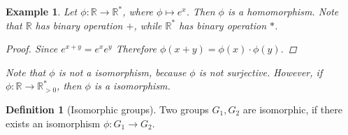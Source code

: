 \documentclass{article}
\theoremstyle{MyNonumberplain}
\theoremstyle{break}
\newtheorem*{proof}{Proof. }
\newcommand{\p}{\phi}
\theoremstyle{break}
\newtheorem{example}{Example}[section]
\theoremstyle{break}
\theoremstyle{definition}
\theoremstyle{break}
\newtheorem{definition}{Definition}[section]
\begin{document}
\begin{expbox}
    \begin{example}
        Let $\p : \mathbb{R} \rightarrow \mathbb{R}^{\ast}$, where $\p \mapsto e^x$.
        Then $\p$ is a homomorphism. Note that $\mathbb{R}$ has binary operation $+$,
        while $\mathbb{R}^{\ast}$ has binary operation $\ast$.
        \begin{prfbox}
            \begin{proof}
                    Since $e^{x+y}=e^xe^y$
                    Therefore $\p (x + y) = \p (x) \cdot \p (y)$.
            \end{proof}
        \end{prfbox}
        Note that $\p$ is not a isomorphism, because $\p$ is not surjective. However,
        if $\p : \mathbb{R} \rightarrow \mathbb{R}^{\ast}_{> 0}$, then $\p$ is a
        isomorphism.
    \end{example}
\end{expbox}

\begin{defbox}
    \begin{definition}[Isomorphic groups]
        Two groups $G_1, G_2$ are isomorphic, if there exists an isomorphism $\p : G_1
        \rightarrow G_2$.
    \end{definition}
\end{defbox}
\end{document}
